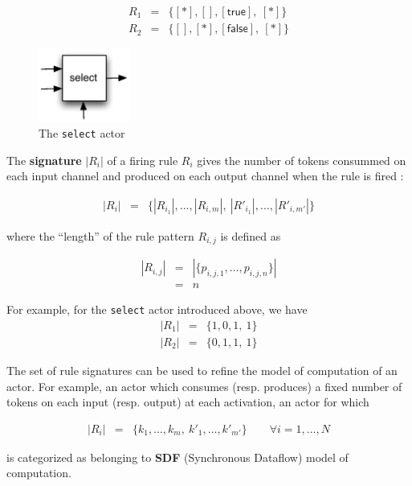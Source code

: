 \begin{eqnarray*}
  R_1 & = & \{ [*], [], [\mathsf{true}],\ [*] \} \\
  R_2 & = & \{ [], [*], [\mathsf{false}],\ [*] \}
\end{eqnarray*}

\begin{figure}[h]
  \centering
  \includegraphics[width=3cm]{figs/select-dpn}
  \caption{The \texttt{select} actor}
  \label{fig:select-dpn}
\end{figure}

\medskip
\noindent
The \textbf{signature} $|R_i|$ of a firing rule $R_i$ gives the number of tokens consummed on each input
channel and produced on each output channel when the rule is fired :

\begin{eqnarray*}
  | R_i | & = & \{ |R_{i_1}|, \ldots, |R_{i,m}|,\ |R'_{i_1}|, \ldots, |R'_{i,m'}| \}
\end{eqnarray*}

where the ``length'' of the rule pattern $R_{i,j}$ is defined as 

\begin{eqnarray*}
  |R_{i,j}| & = & |\{p_{i,j,1},\ldots,p_{i,j,n}\}| \\
           & = & n
\end{eqnarray*}

\medskip
\noindent
For example, for the \texttt{select} actor introduced above, we have
\begin{eqnarray*}
  |R_1| & = & \{1, 0, 1,\ 1\} \\
  |R_2| & = & \{0, 1, 1,\ 1\}
\end{eqnarray*}

\bigskip
\noindent
The set of rule signatures can be used to refine the model of computation of an actor. For example,
an actor which consumes (resp. produces) a fixed number of tokens on each input (resp. output) at each activation, \ie an actor for
which

\begin{eqnarray*}
  |R_i| & = & \{ k_1, \ldots, k_m,\ k'_1, \ldots, k'_{m'} \} \qquad \forall i=1,\ldots,N
\end{eqnarray*}

is categorized as belonging to \textbf{SDF} (Synchronous Dataflow) model of computation.

